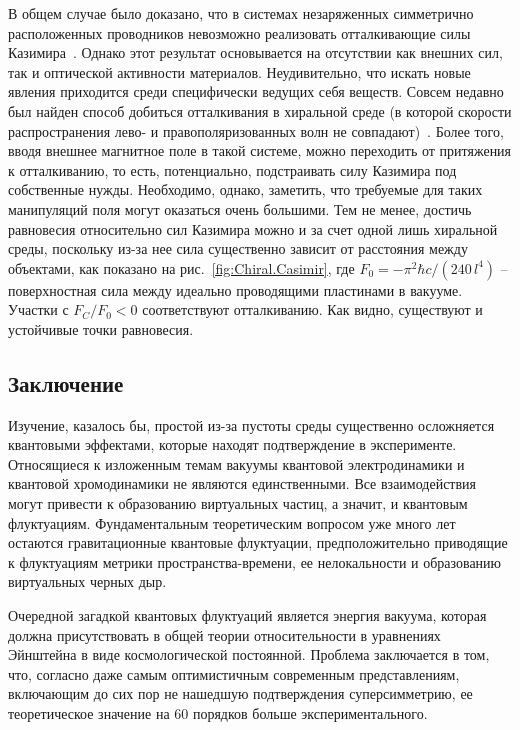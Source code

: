 \documentclass[a4paper, 12pt]{article}
\begin{document}
В общем случае было доказано, что в системах незаряженных симметрично расположенных проводников невозможно реализовать отталкивающие силы Казимира~\cite{Casimir.attr.theorem}. 
Однако этот результат основывается на отсутствии как внешних сил, так и оптической активности материалов. 
Неудивительно, что искать новые явления приходится среди специфически ведущих себя веществ. 
Совсем недавно был найден способ добиться отталкивания в хиральной среде (в которой скорости распространения лево- и правополяризованных волн не совпадают)~\cite{Repulsion.tunable}. 
Более того, вводя внешнее магнитное поле в такой системе, можно переходить от притяжения к отталкиванию, то есть, потенциально, подстраивать силу Казимира под собственные нужды. 
Необходимо, однако, заметить, что требуемые для таких манипуляций поля могут оказаться очень большими. 
Тем не менее, достичь равновесия относительно сил Казимира можно и за счет одной лишь хиральной среды, поскольку из-за нее сила существенно зависит от расстояния между объектами, как показано на рис.~\ref{fig:Chiral.Casimir}, где $F_0 = -{\pi^2\hbar c}/{(240\,l^4)}$ -- поверхностная сила между идеально проводящими пластинами в вакууме. 
Участки с $F_C/F_0<0$ соответствуют отталкиванию. 
Как видно, существуют и устойчивые точки равновесия. 



\subsection{Заключение}

Изучение, казалось бы, простой из-за пустоты среды существенно осложняется квантовыми эффектами, которые находят подтверждение в эксперименте. 
Относящиеся к изложенным темам вакуумы квантовой электродинамики и квантовой хромодинамики не являются единственными.
Все взаимодействия могут привести к образованию виртуальных частиц, а значит, и квантовым флуктуациям. 
Фундаментальным теоретическим вопросом уже много лет остаются гравитационные квантовые флуктуации, предположительно приводящие к флуктуациям метрики пространства-времени, ее нелокальности и образованию виртуальных черных дыр. 

Очередной загадкой квантовых флуктуаций является энергия вакуума, которая должна присутствовать в общей теории относительности в уравнениях Эйнштейна в виде космологической постоянной. 
Проблема заключается в том, что, согласно даже самым оптимистичным современным представлениям, включающим до сих пор не нашедшую подтверждения суперсимметрию, ее теоретическое значение на 60 порядков больше экспериментального. 
\end{document}
